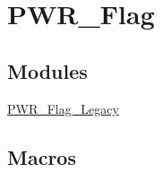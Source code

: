 \hypertarget{group___p_w_r___flag}{}\section{P\+W\+R\+\_\+\+Flag}
\label{group___p_w_r___flag}
\subsection*{Modules}
\begin{DoxyCompactItemize}
\item 
\hyperlink{group___p_w_r___flag___legacy}{P\+W\+R\+\_\+\+Flag\+\_\+\+Legacy}
\end{DoxyCompactItemize}
\subsection*{Macros}
